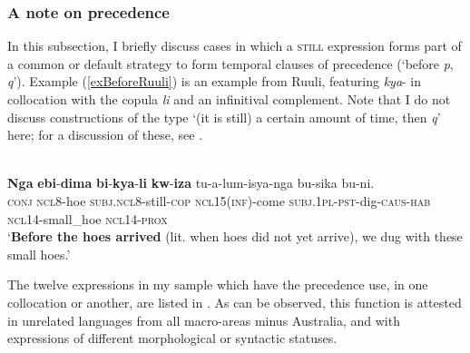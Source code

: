 \subsubsection{A note on precedence}
\label{sectionBefore}
In this subsection, I briefly discuss cases in which a \textsc{still} expression forms part of a common or default strategy to form temporal clauses of precedence (\lq before \textit{p}, \textit{q}\rq{}). Example (\ref{exBeforeRuuli}) is an example from Ruuli, featuring \mbox{\textit{kya}-} in collocation with the copula \textit{li} and an infinitival complement. Note that I do not discuss constructions of the type \lq (it is still) a certain amount of time, then \textit{q}\rq{} here; for a discussion of these, see .

\begin{exe}
	\ex {}\label{exBeforeRuuli}\\
	\gll \textbf{Nga} \textbf{ebi}-\textbf{dima} \textbf{bi}-\textbf{kya}-\textbf{li} \textbf{kw}-\textbf{iza} tu-a-lum-isya-nga bu-sika bu-ni.\\
	\textsc{conj} \textsc{ncl}8-hoe \textsc{subj}.\textsc{ncl}8-still-\textsc{cop} \textsc{ncl}15(\textsc{inf})-come \textsc{subj}.1\textsc{pl}-\textsc{pst}-dig-\textsc{caus}-\textsc{hab} \textsc{ncl}14-small\_hoe \textsc{ncl}14-\textsc{prox}\\
	\glt \lq \textbf{Before the hoes arrived} (lit. when hoes did not yet arrive), we dug with these small hoes.' \parencite[81]{MolochievaEtAl2021}
\end{exe}

The twelve expressions in my sample which have the precedence use, in one collocation or another, are listed in . As can be observed, this function is attested in unrelated languages from all macro-areas minus Australia, and with expressions of different morphological or syntactic statuses.


